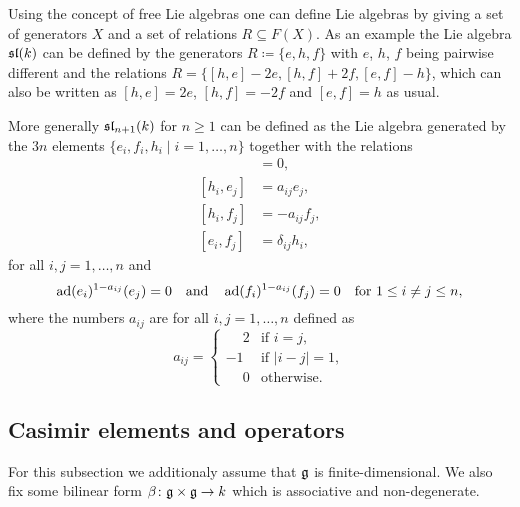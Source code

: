 \begin{rem}
 Using the concept of free Lie algebras one can define Lie algebras by giving a set of generators $X$ and a set of relations $R \subseteq F(X)$. As an example the Lie algebra $\mathfrak{sl}(k)$ can be defined by the generators $R \coloneqq \{e,h,f\}$ with $e$, $h$, $f$ being pairwise different and the relations $R = \{[h,e]-2e, [h,f]+2f, [e,f]-h\}$, which can also be written as $[h,e] = 2e$, $[h,f] = -2f$ and $[e,f] = h$ as usual.
 
 More generally $\mathfrak{sl}_{n+1}(k)$ for $n \geq 1$ can be defined as the Lie algebra generated by the $3n$ elements $\{e_i, f_i, h_i \mid i = 1, \dotsc, n\}$ together with the relations
 \begin{align*}
  [h_i, h_j] &= 0, \\
  [h_i, e_j] &= a_{ij} e_j, \\
  [h_i, f_j] &= -a_{ij} f_j, \\
  [e_i, f_j] &= \delta_{ij} h_i,
 \end{align*}
 for all $i,j = 1, \dotsc, n$ and
 \[
  \operatorname{ad}(e_i)^{1-a_{ij}}(e_j) = 0
  \quad\text{and}\quad
  \operatorname{ad}(f_i)^{1-a_{ij}}(f_j) = 0
  \quad \text{for $1 \leq i \neq j \leq n$},
 \]
 where the numbers $a_{ij}$ are for all $i,j = 1, \dotsc, n$ defined as
 \[
  a_{ij} =
  \begin{cases}
   \phantom{-}2 & \text{if $i = j$}, \\
             -1 & \text{if $|i-j| = 1$}, \\
   \phantom{-}0 & \text{otherwise}.
  \end{cases}
 \]
\end{rem}
































\subsection{Casimir elements and operators}
For this subsection we additionaly assume that $\mathfrak{g}$ is finite-dimensional. We also fix some bilinear form $\beta \colon \mathfrak{g} \times \mathfrak{g} \to k$ which is associative and non-degenerate.


